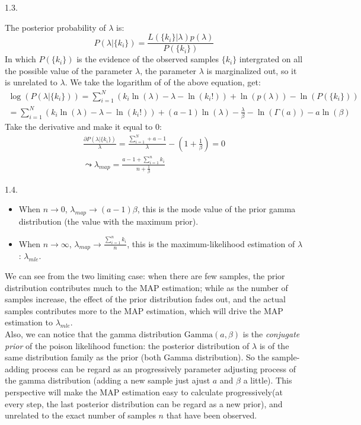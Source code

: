 \documentclass{article}
\theoremstyle{definition}
\theoremstyle{definition}
\theoremstyle{remark}
\begin{document}
1.3.

\begin{addmargin}[3em]{2em}
  The posterior probability of $\lambda$ is:
  \[
  P(\lambda | \{k_i\}) = \frac{L(\{k_i\} | \lambda) p(\lambda)}{P(\{k_i\})}
  \]
  In which $P(\{k_i\})$ is the evidence of the observed samples $\{k_i\}$ intergrated on all the possible value of the parameter $\lambda$, the parameter $\lambda$ is marginalized out, so it is unrelated to $\lambda$. We take the logarithm of of the above equation, get:
  \[
  \begin{split}
  \log(P(\lambda | \{k_i\})) = \sum_{i=1}^N (k_i \ln(\lambda) - \lambda - \ln(k_i!)) + \ln(p(\lambda)) - \ln(P(\{k_i\})) \\
  = \sum_{i=1}^N (k_i \ln(\lambda) - \lambda - \ln(k_i!)) + (a-1)\ln(\lambda) - \frac{\lambda}{\beta} - \ln(\Gamma(a)) - a \ln(\beta)
  \end{split}
  \]
  Take the derivative and make it equal to 0:
  \[
  \begin{split}
  \frac{\partial P(\lambda | \{k_i\})}{\lambda} = \frac{\sum_{i=1}^N + a - 1}{\lambda} - (1 + \frac{1}{\beta}) = 0 \\
  \leadsto \lambda_{map} = \frac{a - 1 + \sum_{i=1}^n k_i}{n + \frac{1}{\beta}}
  \end{split}
  \]

\end{addmargin}

1.4.

\begin{addmargin}[3em]{2em}
  \begin{itemize}
  \item When $n \rightarrow 0$, $\lambda_{map} \rightarrow (a-1)\beta$, this is the mode value of the prior gamma distribution (the value with the maximum prior).
  \item When $n \rightarrow \infty$, $\lambda_{map} \rightarrow \frac{\sum_{i=1}^n k_i}{n}$, this is the maximum-likelihood estimation of $\lambda$: $\lambda_{mle}$.
  \end{itemize}
  \quad We can see from the two limiting case: when there are few samples, the prior distribution contributes much to the MAP estimation; while as the number of samples increase, the effect of the prior distribution fades out, and the actual samples contributes more to the MAP estimation, which will drive the MAP estimation to $\lambda_{mle}$.\\

  \quad Also, we can notice that the gamma distribution $\mbox{Gamma}(a, \beta)$ is the \textit{conjugate prior} of the poison likelihood function: the posterior distribution of $\lambda$ is of the same distribution family as the prior (both Gamma distribution). So the sample-adding process can be regard as an progressively parameter adjusting process of the gamma distribution (adding a new sample just ajust $a$ and $\beta$ a little). This perspective will make the MAP estimation easy to calculate progressively(at every step, the last posterior distribution can be regard as a new prior), and unrelated to the exact number of samples $n$ that have been observed.

\end{addmargin}
\end{document}

